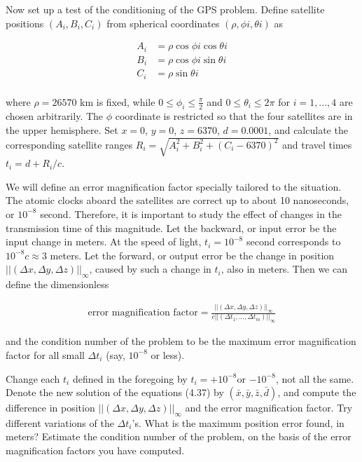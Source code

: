 
Now set up a test of the conditioning of the GPS problem. Define satellite positions $(A_i,B_i,C_i)$ from spherical coordinates $(\rho,\phi i,\theta i)$ as

\begin{align}
	A_i &= \rho \cos{\phi i} \cos{\theta i} \nonumber \\
	B_i &= \rho \cos{\phi i} \sin{\theta i} \nonumber \\
	C_i &= \rho \sin{\theta i} \nonumber \\
\end{align}

where $\rho = 26570$ km is fixed, while $0 \leq \phi_i \leq \frac{\pi}{2}$ and $0 \leq \theta_i \leq 2 \pi$ for $i=1,...,4$ are chosen arbitrarily. The $\phi$ coordinate is restricted so that the four satellites are in the upper hemisphere. Set $x = 0$, $y = 0$, $z = 6370$, $d = 0.0001$, and calculate the corresponding satellite ranges $R_i = \sqrt{A_i^2 + B_i^2 + (C_i − 6370)^2}$ and travel times $t_i = d + R_i /c$.

We will define an error magnification factor specially tailored to the situation. The atomic clocks aboard the satellites are correct up to about 10 nanoseconds, or $10^{−8}$ second. Therefore, it is important to study the effect of changes in the transmission time of this magnitude. Let the backward, or input error be the input change in meters. At the speed of light, $t_i = 10^{−8}$ second corresponds to $10^{−8}c \approx 3$ meters. Let the forward, or output error be the change in position $||(\Delta x,\Delta y,\Delta z)||_\infty$, caused by such a change in $t_i$, also in meters. Then we can define the dimensionless 

\begin{align}
    \text{error magnification factor} = \frac{||(\Delta x,\Delta y,\Delta z)||_\infty}{c||(\Delta t_1,...,\Delta t_m)||_\infty} \nonumber
\end{align}

and the condition number of the problem to be the maximum error magnification factor for all small $\Delta t_i$ (say, $10^{−8}$ or less).

Change each $t_i$ defined in the foregoing by $t_i = +10^{-8}$or $−10^{−8}$, not all the same. Denote the new solution of the equations (4.37) by $(\bar{x},\bar{y},\bar{z},\bar{d})$, and compute the difference in position $||(\Delta x,\Delta y,\Delta z)||_\infty$ and the error magnification factor. Try different variations of the $\Delta t_i$'s. What is the maximum position error found, in meters? Estimate the condition number of the problem, on the basis of the error magnification factors you have computed. 
\vspace{5mm}

